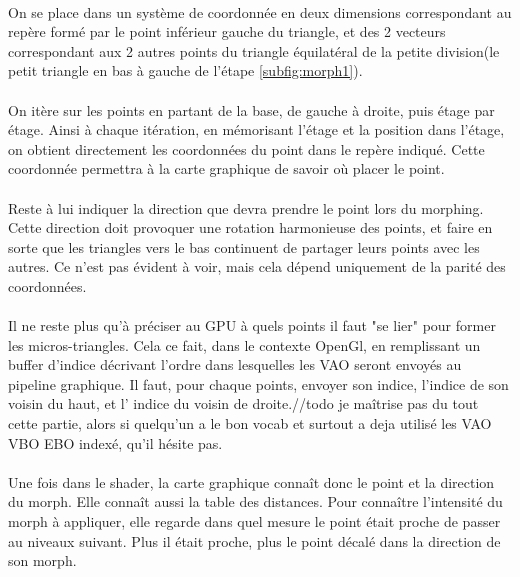 	\paragraph{}
	On se place dans un système de coordonnée en deux dimensions correspondant au repère formé par le point inférieur gauche du triangle, et des 2 vecteurs correspondant aux 2 autres points du triangle équilatéral de la petite division(le petit triangle en bas à gauche de l'étape \ref{subfig:morph1}).
	\paragraph{}
	On itère sur les points en partant de la base, de gauche à droite, puis étage par étage. Ainsi à chaque itération, en mémorisant l'étage et la position dans l'étage, on obtient directement les coordonnées du point dans le repère indiqué. Cette coordonnée permettra à la carte graphique de savoir où placer le point.
	\paragraph{}
	Reste à lui indiquer la direction que devra prendre le point lors du morphing. 
	Cette direction doit provoquer une rotation harmonieuse des points, et faire en sorte que les triangles vers le bas continuent de partager leurs points avec les autres. Ce n'est pas évident à voir, mais cela dépend uniquement de la parité des coordonnées. 
	\paragraph{}
	Il ne reste plus qu'à préciser au GPU à quels points il faut "se lier" pour former les micros-triangles. Cela ce fait, dans le contexte OpenGl, en remplissant un buffer d'indice décrivant l'ordre dans lesquelles les VAO seront envoyés au pipeline graphique. Il faut, pour chaque points, envoyer son indice, l'indice de son voisin du haut, et l' indice du voisin de droite.//todo je maîtrise pas du tout cette partie, alors si quelqu'un a le bon vocab et surtout a deja utilisé les VAO VBO EBO indexé, qu'il hésite pas.
	\paragraph{}
	Une fois dans le shader, la carte graphique connaît donc le point et la direction du morph. Elle connaît aussi la table des distances. Pour connaître l'intensité du morph à appliquer, elle regarde dans quel mesure le point était proche de passer au niveaux suivant. Plus il était proche, plus le point décalé dans la direction de son morph.
	
